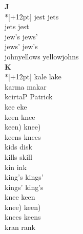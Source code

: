 \vspace{14pt}
\noindent\textbf{\Large J}\\*[+12pt]
jest jets\\
jets jest\\
jew's jews'\\
jews' jew's\\
johnyellows yellowjohns\\

\vspace{14pt}
\noindent\textbf{\Large K}\\*[+12pt]
kale lake\\
karma makar\\
kcirtaP Patrick\\
kee eke\\
keen knee\\
keen) knee)\\
keens knees\\
kids disk\\
kills skill\\
kin ink\\
king's kings'\\
kings' king's\\
knee keen\\
knee) keen)\\
knees keens\\
kran rank\\

